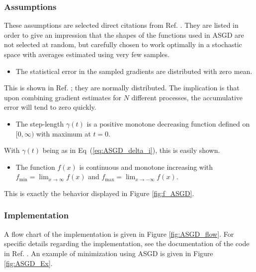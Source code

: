 \subsubsection{Assumptions}

These assumptions are selected direct citations from Ref. \cite{ASGD}. They are listed in order to give an impression that the shapes of the functions used in ASGD are not selected at random, but carefully chosen to work optimally in a stochastic space with averages estimated using very few samples.

\begin{itemize}
 \item The statistical error in the sampled gradients are distributed with zero mean.
\end{itemize}

This is shown in Ref. \cite{ASGD}; they are normally distributed. The implication is that upon combining gradient estimates for $N$ different processes, the accumulative error will tend to zero quickly.

\begin{itemize}
 \item The step-length $\gamma(t)$ is a positive monotone decreasing function defined on $[0,\infty)$ with maximum at $t=0$.
\end{itemize}

With $\gamma(t)$ being as in Eq~(\ref{eq:ASGD_delta_i}), this is easily shown.

\begin{itemize}
 \item The function $f(x)$ is continuous and monotone increasing with $f_\mathrm{min} = \displaystyle\lim_{x\to\infty} f(x)$ and $f_\mathrm{max} =  \displaystyle\lim_{x\to-\infty} f(x)$.
\end{itemize}

This is exactly the behavior displayed in Figure \ref{fig:f_ASGD}.

\subsubsection{Implementation}

A flow chart of the implementation is given in Figure \ref{fig:ASGD_flow}. For specific details regarding the implementation, see the documentation of the code in Ref. \cite{libBorealisCode}. An example of minimization using ASGD is given in Figure \ref{fig:ASGD_Ex}. 

